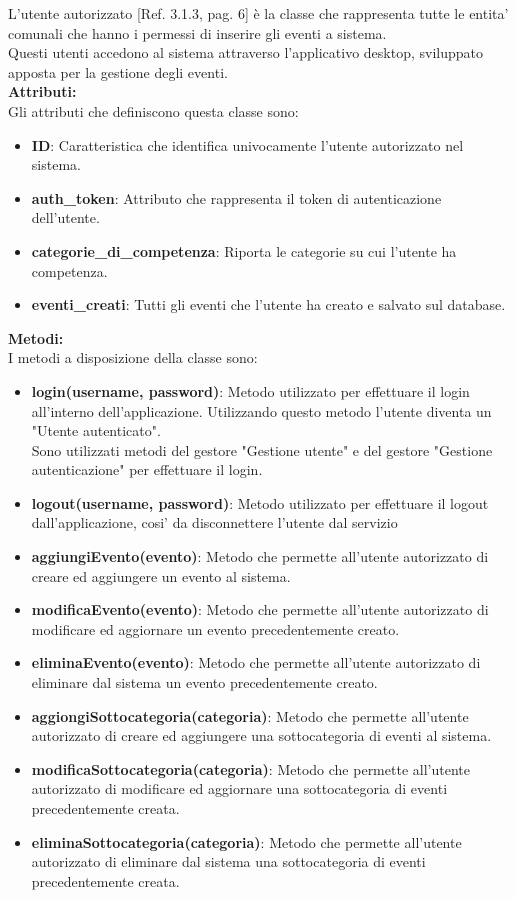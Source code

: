 \documentclass{article}
\begin{document}
L'utente autorizzato [Ref. 3.1.3, pag. 6] è la classe che rappresenta tutte le entita' comunali che hanno i permessi di inserire gli eventi a sistema.\\
Questi utenti accedono al sistema attraverso l'applicativo desktop, sviluppato apposta per la gestione degli eventi.\\

\textbf{Attributi:}\\
Gli attributi che definiscono questa classe sono:
\begin{itemize}
    \item \textbf{ID}: Caratteristica che identifica univocamente l'utente autorizzato nel sistema.
    \item \textbf{auth\_token}: Attributo che rappresenta il token di autenticazione dell'utente.
    \item \textbf{categorie\_di\_competenza}: Riporta le categorie su cui l'utente ha competenza.
    \item \textbf{eventi\_creati}: Tutti gli eventi che l'utente ha creato e salvato sul database.
\end{itemize}

\textbf{Metodi:}\\
I metodi a disposizione della classe sono:
\begin{itemize}
    \item \textbf{login(username, password)}: Metodo utilizzato per effettuare il login all'interno dell'applicazione. Utilizzando questo metodo l'utente diventa un "Utente autenticato".\\Sono utilizzati metodi del gestore "Gestione utente" e del gestore "Gestione autenticazione" per effettuare il login.
    \item \textbf{logout(username, password)}: Metodo utilizzato per effettuare il logout dall'applicazione, cosi' da disconnettere l'utente dal servizio
    \item \textbf{aggiungiEvento(evento)}: Metodo che permette all'utente autorizzato di creare ed aggiungere un evento al sistema.
    \item \textbf{modificaEvento(evento)}: Metodo che permette all'utente autorizzato di modificare ed aggiornare un evento precedentemente creato.
    \item \textbf{eliminaEvento(evento)}: Metodo che permette all'utente autorizzato di eliminare dal sistema un evento precedentemente creato.
    \item \textbf{aggiongiSottocategoria(categoria)}: Metodo che permette all'utente autorizzato di creare ed aggiungere una sottocategoria di eventi al sistema.
    \item \textbf{modificaSottocategoria(categoria)}: Metodo che permette all'utente autorizzato di modificare ed aggiornare una sottocategoria di eventi precedentemente creata.
    \item \textbf{eliminaSottocategoria(categoria)}: Metodo che permette all'utente autorizzato di eliminare dal sistema una sottocategoria di eventi precedentemente creata.
\end{itemize}
\end{document}
